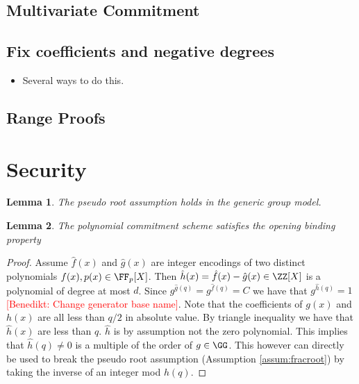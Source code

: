 \documentclass{article}
\newtheorem{lemma}{Lemma}
\newcommand{\benedikt}[1]{{\textcolor{red}{[Benedikt: #1]}}}
\newcommand{\benedikt}[1]{}
\begin{document}
\subsection{Multivariate Commitment}
  
\subsection{Fix coefficients and negative degrees}
\begin{itemize}
	\item Several ways to do this.
\end{itemize}
\subsection{Range Proofs}

\section{Security}


\begin{lemma}
	The pseudo root assumption holds in the generic group model.
\end{lemma}
\begin{lemma}
	The polynomial commitment scheme satisfies the opening binding property
\end{lemma}
\begin{proof}
	Assume $\hat{f}(x)$ and $\hat{g}(x)$ are integer encodings of two distinct polynomials $f(x),p(x) \in \FF_p[X]$. Then $\hat{h}(x)=\hat{f}(x)-\hat{g}(x) \in \ZZ[X]$ is a polynomial of degree at most $d$. Since $g^{\hat{g}(q)}=g^{\hat{f}(q)}=C$ we have that $g^{\hat{h}(q)}=1$\benedikt{Change generator base name}. Note that the coefficients of $g(x)$ and $h(x)$ are all less than $q/2$ in absolute value. By triangle inequality we have that $\hat{h}(x)$ are less than $q$. $\hat{h}$ is by assumption not the zero polynomial. This implies that $\hat{h}(q)\neq 0$ is a multiple of the order of $g\in \GG$. This however can directly be used to break the pseudo root assumption (Assumption \ref{assum:fracroot}) by taking the inverse of an integer mod $h(q)$.
\end{proof}
\end{document}
